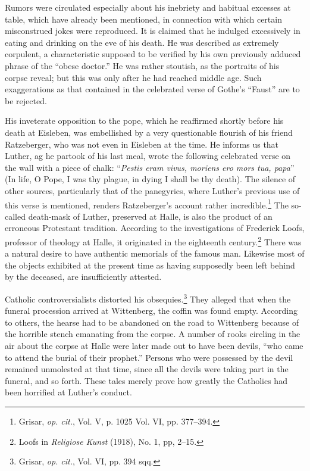 Rumors were circulated especially about his inebriety and habitual
excesses at table, which have already been mentioned, in connection
with which certain misconstrued jokes were reproduced. It is claimed
that he indulged excessively in eating and drinking on the eve of
his death. He was described as extremely corpulent, a characteristic
supposed to be verified by his own previously adduced phrase of
the “obese doctor.” He was rather stoutish, as the portraits of his
corpse reveal; but this was only after he had reached middle age.
Such exaggerations as that contained in the celebrated verse of
Gothe’s “Faust” are to be rejected.

His inveterate opposition to the pope, which he reaffirmed shortly
before his death at Eisleben, was embellished by a very questionable
flourish of his friend Ratzeberger, who was not even in Eisleben at
the time. He informs us that Luther, ag he partook of his last meal,
wrote the following celebrated verse on the wall with a piece of
chalk: “\textit{Pestis eram vivus, moriens ero mors tua, papa}” (In life, O
Pope, I was thy plague, in dying I shall be thy death). The silence of
other sources, particularly that of the panegyrics, where Luther’s
previous use of this verse is mentioned, renders Ratzeberger’s account
rather incredible.\footnote{Grisar, \textit{op. cit.}, Vol. V, p. 1025 Vol. VI, pp. 377--394.}
 The so-called death-mask of Luther, preserved
at Halle, is also the product of an erroneous Protestant tradition.
According to the investigations of Frederick Loofs, professor of theology
at Halle, it originated in the eighteenth century.\footnote{Loofs in \textit{Religiose Kunst} (1918), No. 1, pp, 2--15.}
 There was
a natural desire to have authentic memorials of the famous man.
Likewise most of the objects exhibited at the present time as having
supposedly been left behind by the deceased, are insufficiently attested.

Catholic controversialists distorted his obsequies.\footnote{Grisar, \textit{op.
cit.}, Vol. VI, pp. 394 sqq.} They alleged that when the funeral procession
arrived at Wittenberg, the coffin was found empty. According to others, the
hearse had to be abandoned on the road to Wittenberg because of the horrible
stench emanating from the corpse. A number of rooks circling in the air about
the corpse at Halle were later made out to have been devils, “who came to
attend the burial of their prophet.” Persons who were possessed by the devil
remained unmolested at that time, since all the devils were taking part in the
funeral, and so forth. These tales merely prove how greatly the Catholics had
been horrified at Luther’s conduct.

